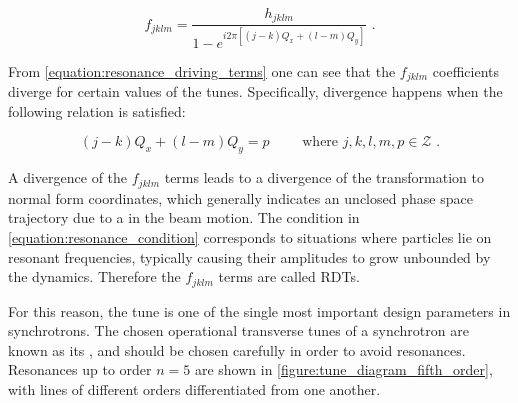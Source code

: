 \begin{equation}
    f_{jklm} = \frac{h_{jklm}}{1 - e^{i 2 \pi \left[ \left(j-k\right) Q_x + \left(l-m\right) Q_y \right]}} \text{ .}
    \label{equation:resonance_driving_terms}
\end{equation}

From \cref{equation:resonance_driving_terms} one can see that the \(f_{jklm}\) coefficients diverge for certain values of the tunes.
Specifically, divergence happens when the following relation is satisfied:

\begin{equation}
    \left(j-k\right) Q_x + \left(l-m\right) Q_y = p \quad \quad \text { where } j, k, l, m, p \in \mathcal{Z} \text{ .}
    \label{equation:resonance_condition}
\end{equation}

A divergence of the \(f_{jklm}\) terms leads to a divergence of the transformation to normal form coordinates, which generally indicates an unclosed phase space trajectory due to a  in the beam motion.
The condition in \cref{equation:resonance_condition} corresponds to situations where particles lie on resonant frequencies, typically causing their amplitudes to grow unbounded by the dynamics.
Therefore the \(f_{jklm}\) terms are called \glspl{RDT}.

For this reason, the tune is one of the single most important design parameters in synchrotrons.
The chosen operational transverse tunes of a synchrotron are known as its , and should be chosen carefully in order to avoid resonances.
Resonances up to order \(n = 5\) are shown in \cref{figure:tune_diagram_fifth_order}, with lines of different orders differentiated from one another.

